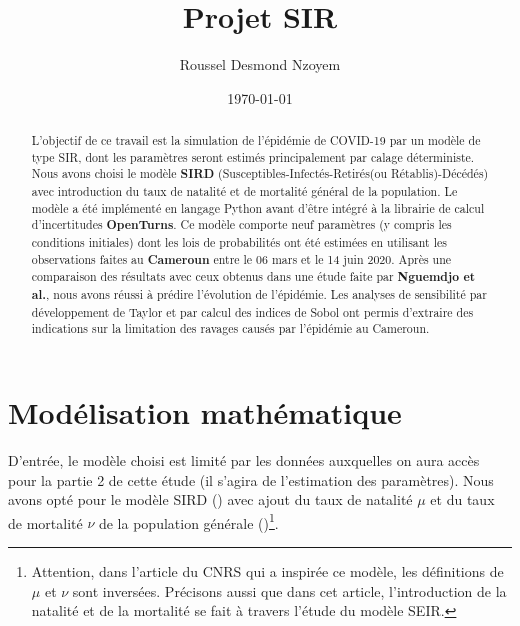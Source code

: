 \documentclass[
  french,
	10pt, %
]{fphw}
\title{Projet SIR} %
\author{Roussel Desmond Nzoyem} %
\date{\today} %
\institute{Université de Strasbourg \\ UFR de Mathématiques et Informatique} %
\begin{document}


\renewcommand{\abstractname}{Introduction}
\maketitle
\begin{abstract}
  \normalsize
  L'objectif de ce travail est la simulation de l'épidémie de COVID-19 par un modèle de type SIR, dont les paramètres seront estimés principalement par calage déterministe. Nous avons choisi le modèle \textbf{SIRD} (Susceptibles-Infectés-Retirés(ou Rétablis)-Décédés) avec introduction du taux de natalité et de mortalité général de la population. Le modèle a été implémenté en langage Python avant d'être intégré à la librairie de calcul d'incertitudes \textbf{OpenTurns}. Ce modèle comporte neuf paramètres (y compris les conditions initiales) dont les lois de probabilités ont été estimées en utilisant les observations faites au \textbf{Cameroun} entre le 06 mars et le 14 juin 2020. Après une comparaison des résultats avec ceux obtenus dans une étude faite par \textbf{Nguemdjo et al.}, nous avons réussi à prédire l'évolution de l'épidémie. Les analyses de sensibilité par développement de Taylor et par calcul des indices de Sobol ont permis d'extraire des indications sur la limitation des ravages causés par l'épidémie au Cameroun.
\end{abstract}


\section{Modélisation mathématique}

D'entrée, le modèle choisi est limité par les données auxquelles on aura accès pour la partie 2 de cette étude (il s'agira de l'estimation des paramètres). Nous avons opté pour le modèle SIRD (\cite{Kaggle}) avec ajout du taux de natalité $\mu$ et du taux de mortalité $\nu$ de la population générale (\cite{CNRS})\footnote{Attention, dans l'article du CNRS qui a inspirée ce modèle, les définitions de $\mu$ et $\nu$ sont inversées. Précisons aussi que dans cet article, l'introduction de la natalité et de la mortalité se fait à travers l'étude du modèle SEIR.}. 
\end{document}

